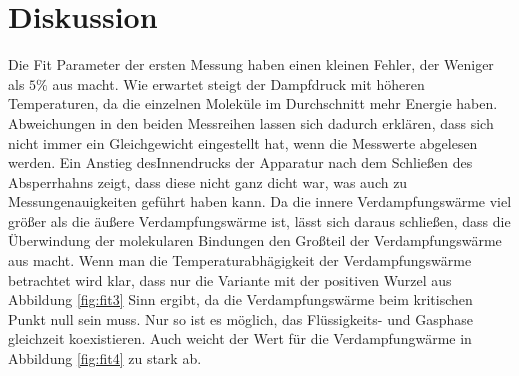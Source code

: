 \section{Diskussion}
\label{sec:Diskussion}
Die Fit Parameter der ersten Messung haben einen kleinen Fehler, der Weniger als
$5\%$ aus macht. Wie erwartet steigt der Dampfdruck mit
höheren Temperaturen, da die einzelnen Moleküle im Durchschnitt mehr
Energie haben. Abweichungen in den beiden Messreihen lassen sich dadurch erklären,
dass sich nicht immer ein Gleichgewicht eingestellt hat, wenn die Messwerte
abgelesen werden. Ein Anstieg desInnendrucks der Apparatur nach dem Schließen des
Absperrhahns zeigt, dass diese nicht ganz dicht war, was auch zu Messungenauigkeiten
geführt haben kann. Da die innere Verdampfungswärme viel größer als die äußere
Verdampfungswärme ist, lässt sich daraus schließen, dass die Überwindung der molekularen
Bindungen den Großteil der Verdampfungswärme aus macht. Wenn man die
Temperaturabhägigkeit der Verdampfungswärme betrachtet wird klar, dass nur die
Variante mit der positiven Wurzel aus
Abbildung \ref{fig:fit3} Sinn ergibt, da die Verdampfungswärme beim kritischen
Punkt null sein muss.  Nur so ist es möglich, das Flüssigkeits- und Gasphase
gleichzeit koexistieren. Auch weicht der Wert für die Verdampfungwärme in
Abbildung \ref{fig:fit4} zu stark ab.
